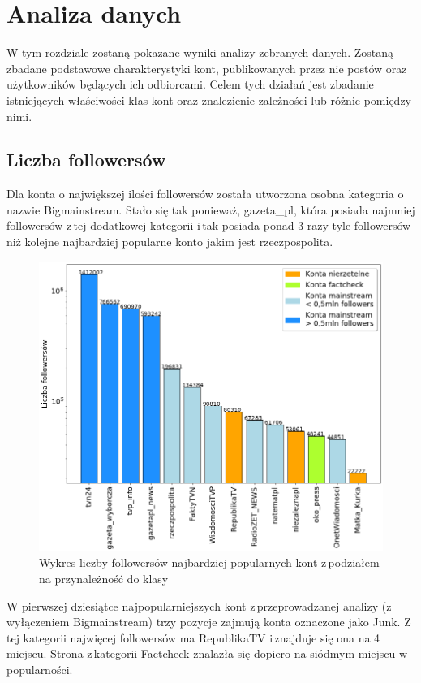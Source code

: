 \newpage
\section{Analiza danych}
W tym rozdziale zostaną pokazane wyniki analizy zebranych danych. Zostaną zbadane podstawowe charakterystyki kont, publikowanych przez nie postów oraz użytkowników będących ich odbiorcami.  Celem tych działań jest zbadanie istniejących właściwości klas kont oraz znalezienie zależności lub różnic pomiędzy nimi.  
\subsection{Liczba followersów }Dla konta o największej ilości followersów została utworzona osobna kategoria o\,nazwie Bigmainstream. Stało się tak ponieważ, gazeta\_pl, która posiada najmniej followersów z\,tej dodatkowej kategorii i\,tak posiada ponad 3 razy tyle followersów niż kolejne najbardziej popularne konto jakim jest rzeczpospolita.
\begin{figure}[!h]
	\label{fig:followers}
	\centering \includegraphics[width=0.9\linewidth]{img/results/followers.png}
	\caption{Wykres liczby followersów najbardziej popularnych kont z\,podziałem na przynależność do klasy}
\end{figure}
\par
W pierwszej dziesiątce najpopularniejszych kont z\,przeprowadzanej analizy (z wyłączeniem Bigmainstream) trzy pozycje zajmują konta oznaczone jako Junk. Z\,tej kategorii najwięcej followersów ma RepublikaTV i\,znajduje się ona na 4 miejscu. Strona z\,kategorii Factcheck znalazła się dopiero na siódmym miejscu w\,popularności.

